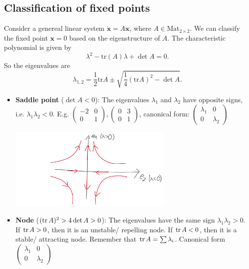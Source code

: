 \documentclass[hidelinks,a4paper, 11pt]{article}
\theoremstyle{plain}
\theoremstyle{break}
\theoremstyle{plain}
\theoremstyle{definition}
\begin{document}
\subsection{Classification of fixed points}

Consider a genereal linear system $\mathbf{\dot x} = A \mathbf x$, where $A \in \mathrm{Mat}_{2 \times 2}$. We can classify the fixed point $\mathbf x = 0$ based on the eigenstructure of $A$. The characteristic polynomial is given by 
\[
	\lambda^2 - \mathrm{tr}(A)\lambda  + \det A = 0.
\]
So the eigenvalues are
\[
	\lambda_{1,2} = \frac{1}{2}\mathrm{tr}A \pm \sqrt{\frac{1}{4}(\mathrm{tr}A)^2 - \det A}.
\]

\begin{itemize}
	\item \textbf{Saddle point} ($\det A < 0$): The eigenvalues $\lambda_1$ and $\lambda_2$ have opposite signs, i.e. $\lambda_1 \lambda_2 < 0$. E.g. $\begin{pmatrix}
	-2 & 0 \\ 0 & 1
	\end{pmatrix}, \begin{pmatrix}
	0 & 3 \\ 0 & 1
	\end{pmatrix}$, canonical form: $\begin{pmatrix}
		\lambda_1 & 0 \\ 0 & \lambda_2
	\end{pmatrix}$
	\begin{center}
			\includegraphics*[height=4cm]{saddle_point.png}
	\end{center}

	\item \textbf{Node} ($(\tr A)^2 > 4\det A > 0$): The eigenvalues have the same sign $\lambda_1\lambda_2 > 0$. If $\tr A > 0$, then it is an unstable/ repelling node. If $\tr A < 0$, then it is a stable/ attracting node. Remember that $\tr A = \sum \lambda_i$. Canonical form $\begin{pmatrix}
	\lambda_1 & 0 \\ 0 & \lambda_2
	\end{pmatrix}$


\end{itemize}
\end{document}

